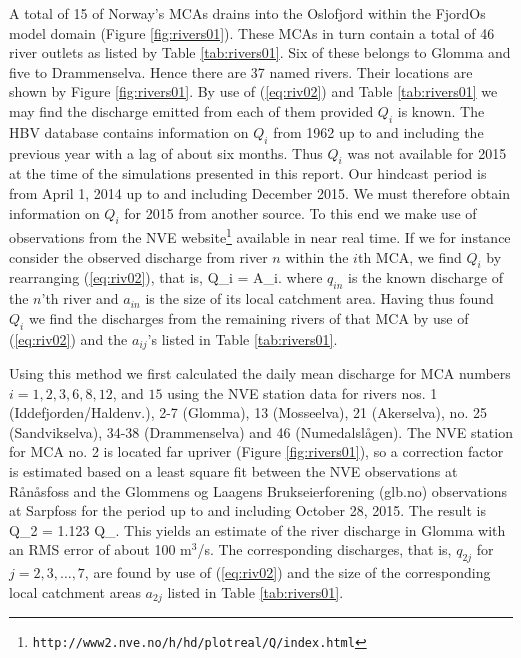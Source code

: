 A total of 15 of Norway's MCAs drains into the Oslofjord within the FjordOs model domain (Figure \ref{fig:rivers01}). These MCAs in turn contain a total of 46 river outlets as listed by Table \ref{tab:rivers01}. Six of these belongs to Glomma and five to Drammenselva. Hence there are 37 named rivers. Their locations are shown by Figure \ref{fig:rivers01}. By use of (\ref{eq:riv02}) and Table \ref{tab:rivers01} we may find the discharge emitted from each of them provided $Q_i$ is known. The HBV database contains information on $Q_i$ from 1962 up to and including the previous year with a lag of about six months. Thus $Q_i$ was not available for 2015 at the time of the simulations presented in this report. Our hindcast period is from April 1, 2014 up to and including December 2015. We must therefore obtain information on $Q_i$ for 2015 from another source. To this end we make use of observations from the NVE website\footnote{\texttt{http://www2.nve.no/h/hd/plotreal/Q/index.html}} available in near real time. If we for instance consider the observed discharge from river $n$ within the $i$th MCA, we find $Q_i$ by rearranging (\ref{eq:riv02}), that is,
\be
 \label{eq:riv03}
  Q_i = A_i.
\ee
where $q_{in}$ is the known discharge of the $n$'th river and $a_{in}$ is the size of its local catchment area. Having thus found $Q_i$ we find the discharges from the remaining rivers of that MCA by use of (\ref{eq:riv02}) and the $a_{ij}$'s listed in Table \ref{tab:rivers01}.

Using this method we first calculated the daily mean discharge for MCA numbers $i=1, 2, 3, 6, 8, 12$, and $15$ using the NVE station data for rivers nos. 1 (Iddefjorden/Haldenv.), 2-7 (Glomma), 13 (Mosseelva), 21 (Akerselva), no. 25 (Sandvikselva), 34-38 (Drammenselva) and 46 (Numedalsl{\aa}gen). The NVE station for MCA no. 2 is located far upriver (Figure \ref{fig:rivers01}), so a correction factor is estimated based on a least square fit between the NVE observations at R{\aa}n{\aa}sfoss and the Glommens og Laagens Brukseierforening (glb.no) observations at Sarpfoss for the period up to and including October 28, 2015. The result is
\be
 \label{eq:riv04}
 Q_2 = 1.123 \cdot Q_{}.
\ee
This yields an estimate of the river discharge in Glomma with an RMS error of about 100 m$^3$/s. The corresponding discharges, that is, $q_{2j}$ for $j=2,3,\ldots,7$, are found by use of (\ref{eq:riv02}) and the size of the corresponding local catchment areas $a_{2j}$ listed in Table \ref{tab:rivers01}.


